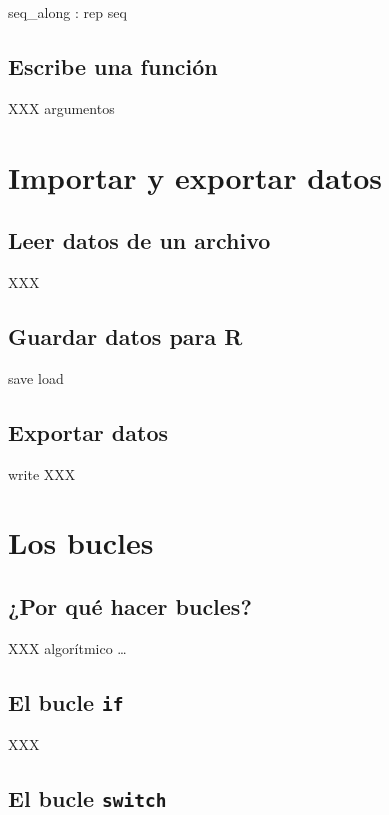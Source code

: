 \documentclass[]{book}
\begin{document}
seq\_along : rep seq

\section{Escribe una función}\label{escribe-una-funcion}

XXX argumentos

\chapter{Importar y exportar datos}\label{import}

\section{Leer datos de un archivo}\label{leer-datos-de-un-archivo}

XXX

\section{Guardar datos para R}\label{guardar-datos-para-r}

save load

\section{Exportar datos}\label{exportar-datos}

write XXX

\chapter{Los bucles}\label{loops}

\section{¿Por qué hacer bucles?}\label{por-que-hacer-bucles}

XXX algorítmico \ldots{}

\section{\texorpdfstring{El bucle
\texttt{if}}{El bucle if}}\label{el-bucle-if}

XXX

\section{\texorpdfstring{El bucle
\texttt{switch}}{El bucle switch}}\label{el-bucle-switch}
\end{document}
